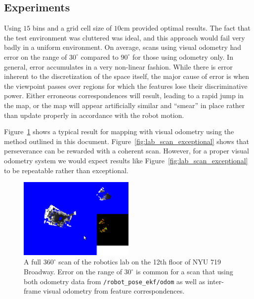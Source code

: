 \documentclass[letterpaper]{article}%
\begin{document}
\subsection{Experiments}
Using $15$ bins and a grid cell size of $10$cm provided optimal results. The
fact that the test environment was cluttered was ideal, and this approach would
fail very badly in a uniform environment. On average, scans using visual
odometry had error on the range of $30^{\circ}$ compared to $90^{\circ}$ for
those using odometry only. In general, error accumulates in a very non-linear
fashion. While there is error inherent to the discretization of the space
itself, the major cause of error is when the viewpoint passes over regions for
which the features lose their discriminative power. Either erroneous
correspondences will result, leading to a rapid jump in the map, or the map
will appear artificially similar and ``smear'' in place rather than update
properly in accordance with the robot motion.

Figure~\ref{fig:lab_scan_typical} shows a typical result for mapping with
visual odometry using the method outlined in this document.
Figure~\ref{fig:lab_scan_exceptional} shows that perseverance can be rewarded
with a coherent scan. However, for a proper visual odometry system we would
expect results like Figure~\ref{fig:lab_scan_exceptional} to be repeatable
rather than exceptional.

\begin{figure}
  \centering
  \includegraphics[width=0.5\textwidth]{lab_scans/lab_scan_03.png}
  \caption{A full $360^{\circ}$ scan of the robotics lab on the 12th floor of
  NYU 719 Broadway. Error on the range of $30^{\circ}$ is common for a scan
  that using both odometry data from {\tt /robot\_pose\_ekf/odom} as well as
  inter-frame visual odometry from feature correspondences.}
  \label{fig:lab_scan_typical}
\end{figure}
\end{document}
